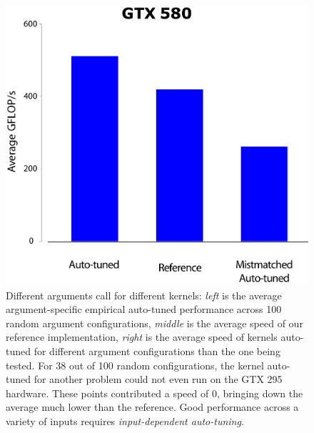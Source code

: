 \documentclass{sig-alternate}
\begin{document}
\begin{figure}[!t]
\centering
\includegraphics[width=\linewidth]{illustrator/fig_allstars_mixup_580_R1.pdf}
\caption{Different arguments call for different kernels:
{\em left} is the average argument-specific empirical
auto-tuned performance across 100 random argument configurations,
{\em middle} is the average speed of our reference implementation,
{\em right} is the average speed of kernels auto-tuned for different argument
configurations than the one being tested.  For 38 out of 100 random configurations, the
kernel auto-tuned for another problem could not even run on the GTX 295
hardware.  These points contributed a speed of 0, bringing down the average
much lower than the reference.  Good performance across a variety of inputs
requires {\em input-dependent auto-tuning}.
}
\label{fig:allstars}
\end{figure}
\end{document}
